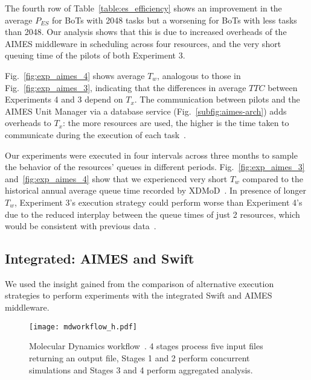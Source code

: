 \documentclass[10pt, conference, compsocconf]{IEEEtran}
\begin{document}
The fourth row of Table~\ref{table:es_efficiency} shows an improvement in the
average \(P_{ES}\) for BoTs with 2048 tasks but a worsening for BoTs with
less tasks than 2048. Our analysis shows that this is due to increased
overheads of the AIMES middleware in scheduling across four resources, and
the very short queuing time of the pilots of both Experiment 3.

Fig.~\ref{fig:exp_aimes_4} shows average \(T_w\), analogous to those in
Fig.~\ref{fig:exp_aimes_3}, indicating that the differences in average
\(TTC\) between Experiments 4 and 3 depend on \(T_x\). The communication
between pilots and the AIMES Unit Manager via a database service
(Fig.~\ref{subfig:aimes-arch}) adds overheads to \(T_x\): the more resources
are used, the higher is the time taken to communicate during the execution of
each task~\cite{merzky2015radical}.

Our experiments were executed in four intervals across three months to sample
the behavior of the resources' queues in different periods.
Fig.~\ref{fig:exp_aimes_3} and~\ref{fig:exp_aimes_4} show that we experienced
very short \(T_w\) compared to the historical annual average queue time
recorded by XDMoD~\cite{xdmod_url}. In presence of longer \(T_w\), Experiment
3's execution strategy could perform worse than Experiment 4's due to the
reduced interplay between the queue times of just 2 resources, which would be
consistent with previous data~\cite{turilli2016integrating}.

\subsection{Integrated: AIMES and Swift}\label{ssec:exp_integration}

We used the insight gained from the comparison of alternative execution
strategies to perform experiments with the integrated Swift and AIMES
middleware.

\begin{figure}
  \centering
  \texttt{[image: mdworkflow\_h.pdf]}
  \caption{Molecular Dynamics workflow~\cite{balasubramanian2016ensemble}. 4
    stages process five input files returning an output file, Stages 1 and 2
    perform concurrent simulations and Stages 3 and 4 perform aggregated
    analysis.}\label{fig:workflow}
\end{figure}
\end{document}
